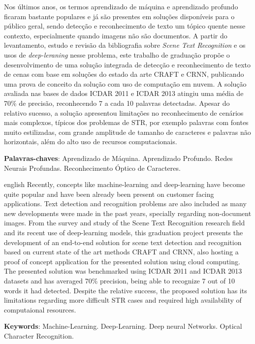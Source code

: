 
\setlength{\absparsep}{18pt} %
\begin{resumo}
Nos últimos anos, os termos aprendizado de máquina e aprendizado profundo ficaram bastante populares e já são presentes em soluções disponíveis para o público geral, sendo detecção e reconhecimento de texto um tópico quente nesse contexto, especialmente quando imagens não são documentos.
A partir do levantamento, estudo e revisão da bibliografia sobre \textit{Scene Text Recognition} e os usos de \textit{deep-leraning} nesse problema, este trabalho de graduação propõe o desenvolvimento de uma solução integrada de detecção e reconhecimento de texto de cenas com base em soluções do estado da arte CRAFT e CRNN, publicando uma prova de conceito da solução com uso de computação em nuvem.
A solução avaliada nas bases de dados ICDAR 2011 e ICDAR 2013 atingiu uma média de 70\% de precisão, reconhecendo 7 a cada 10 palavras detectadas. Apesar do relativo sucesso, a solução apresentou limitações no reconhecimento de cenários mais complexos, típicos dos problemas de STR, por exemplo palavras com fontes muito estilizadas, com grande amplitude de tamanho de caracteres e palavras não horizontais, além do alto uso de recursos computacionais.

 \textbf{Palavras-chaves}: Aprendizado de Máquina. Aprendizado Profundo. Redes Neurais Profundas. Reconhecimento Óptico de Caracteres.
\end{resumo}

\begin{resumo}[Abstract]
 \begin{otherlanguage*}{english}
   Recently, concepts like machine-learning and deep-learning have become quite popular and have been already been present on customer facing applications. Text detection and recognition problems are also included as many new developments were made in the past years, specially regarding non-document images.
   From the survey and study of the Scene Text Recognition research field and its recent use of deep-learning models, this graduation project presents the development of an end-to-end solution for scene text detection and recognition based on current state of the art methods CRAFT and CRNN, also hosting a proof of concept application for the presented solution using cloud computing. 
   The presented solution was benchmarked using ICDAR 2011 and ICDAR 2013 datasets and has averaged 70\% precision, being able to recognize 7 out of 10 words it had detected. Despite the relative success, the proposed solution has its limitations regarding more difficult STR cases and required high availability of computaional resources.

   \vspace{\onelineskip}
 
   \noindent 
   \textbf{Keywords}: Machine-Learning. Deep-Learning. Deep neural Networks. Optical Character Recognition.
 \end{otherlanguage*}
\end{resumo}